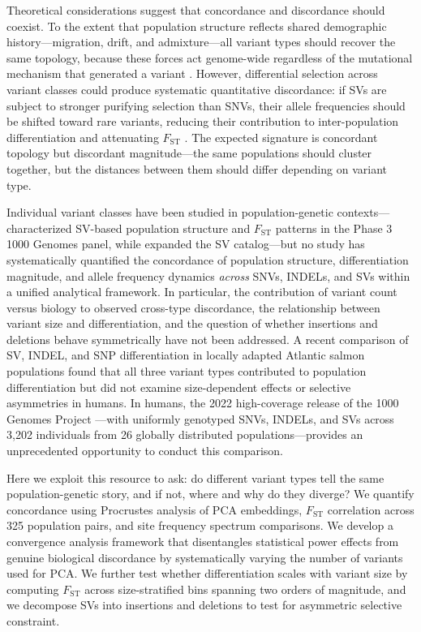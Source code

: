 Theoretical considerations suggest that concordance and discordance should coexist. To the extent that population structure reflects shared demographic history---migration, drift, and admixture---all variant types should recover the same topology, because these forces act genome-wide regardless of the mutational mechanism that generated a variant \citep{wright1949}. However, differential selection across variant classes could produce systematic quantitative discordance: if SVs are subject to stronger purifying selection than SNVs, their allele frequencies should be shifted toward rare variants, reducing their contribution to inter-population differentiation and attenuating $F_\mathrm{ST}$ \citep{charlesworth1998}. The expected signature is concordant topology but discordant magnitude---the same populations should cluster together, but the distances between them should differ depending on variant type.

Individual variant classes have been studied in population-genetic contexts---\citet{sudmant2015} characterized SV-based population structure and $F_\mathrm{ST}$ patterns in the Phase 3 1000 Genomes panel, while \citet{collins2020} expanded the SV catalog---but no study has systematically quantified the concordance of population structure, differentiation magnitude, and allele frequency dynamics \emph{across} SNVs, INDELs, and SVs within a unified analytical framework. In particular, the contribution of variant count versus biology to observed cross-type discordance, the relationship between variant size and differentiation, and the question of whether insertions and deletions behave symmetrically have not been addressed. A recent comparison of SV, INDEL, and SNP differentiation in locally adapted Atlantic salmon populations \citep{lecomte2024} found that all three variant types contributed to population differentiation but did not examine size-dependent effects or selective asymmetries in humans. In humans, the 2022 high-coverage release of the 1000 Genomes Project \citep{byrskaBishop2022}---with uniformly genotyped SNVs, INDELs, and SVs across 3,202 individuals from 26 globally distributed populations---provides an unprecedented opportunity to conduct this comparison.

Here we exploit this resource to ask: do different variant types tell the same population-genetic story, and if not, where and why do they diverge? We quantify concordance using Procrustes analysis of PCA embeddings, $F_\mathrm{ST}$ correlation across 325 population pairs, and site frequency spectrum comparisons. We develop a convergence analysis framework that disentangles statistical power effects from genuine biological discordance by systematically varying the number of variants used for PCA. We further test whether differentiation scales with variant size by computing $F_\mathrm{ST}$ across size-stratified bins spanning two orders of magnitude, and we decompose SVs into insertions and deletions to test for asymmetric selective constraint.

